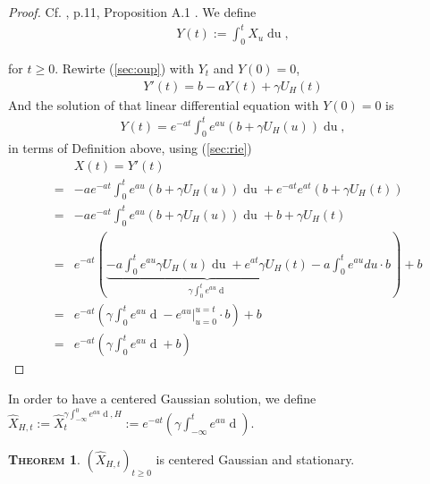 \documentclass[a4paper, twoside, 11pt]{article}
\theoremstyle{definition}
\newtheorem{theorem}[definition]{\scshape Theorem}
\newcommand{\brkt}[1]{\left({#1} \right)}
\begin{document}
\begin{proof}
  Cf. \cite{chriel}, p.11, Proposition A.1 . We define
  \begin{eqnarray*}
	Y(t):=\int_0^t X_u \mathop{du},
  \end{eqnarray*}
 
 for $t\ge 0$. Rewirte (\ref{sec:oup}) with $Y_t$ and $Y(0)=0$,
  \begin{eqnarray*}
	Y'(t) = b - aY(t) + \gamma U_H(t)
  \end{eqnarray*}
  And the solution of that linear differential equation with $Y(0)=0$ is
  \begin{eqnarray*}
	Y(t) = e^{-at}\int_0^t e^{au}(b+\gamma U_H(u)) \mathop{du},
  \end{eqnarray*}
  in terms of Definition above, using (\ref{sec:rie})
	\begin{eqnarray*}
	&&X(t) =  Y'(t)\\
	&=& -ae^{-at}\int_0^t e^{au}(b+\gamma U_H(u)) \mathop{du} + e^{-at}e^{at}(b+\gamma U_H(t)) \\
	&=&  -ae^{-at}\int_0^t e^{au}(b+\gamma U_H(u)) \mathop{du} + b +\gamma U_H(t)\\
	&=& e^{-at} \brkt{\underbrace{-a\int_0^t e^{au} \gamma U_H(u) \mathop{du} + e^{at}\gamma U_H(t)}_{\gamma\int_0^t e^{au} \mathop{dU_H(u)}} -a\int_0^t e^{au} du \cdot b } + b\\
  &=&  e^{-at} \brkt{\gamma\int_0^t e^{au} \mathop{dU_H(u)} - e^{au}|^{u=t}_{u=0} \cdot b } + b\\
  &=&  e^{-at} \brkt{\gamma\int_0^t e^{au} \mathop{dU_H(u)} + b}
	\end{eqnarray*}
\end{proof}

In order to have a centered Gaussian solution, we define $\hat{X}_{H,t}:= \hat{X}_t^{\gamma\int_{-\infty}^0 e^{au}\mathop{dU_H(u)}, H} := e^{-at}\brkt{\gamma\int_{-\infty}^t e^{au}\mathop{dU_H(u)}}$.
\begin{theorem}
  $(\hat{X}_{H,t})_{t\ge 0}$ is centered Gaussian and stationary.
  \label{sec:gsp}
\end{theorem}
\end{document}
